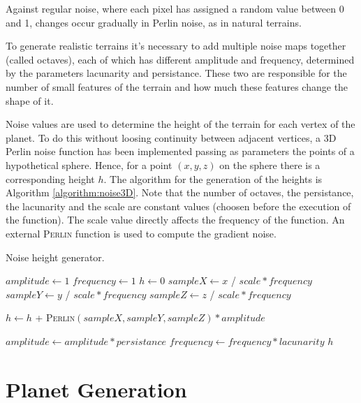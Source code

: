 \documentclass[paper=a4, fontsize=11pt]{scrartcl} %
\numberwithin{equation}{section} %
\numberwithin{figure}{section} %
\numberwithin{table}{section} %
\theoremstyle{definition}
\begin{document}
Against regular noise, where each pixel has assigned a random value between 0
and 1, changes occur gradually in Perlin noise, as in natural terrains.

To generate realistic terrains it's necessary to add multiple noise maps
together (called octaves), each of which has different amplitude and frequency,
determined by the parameters lacunarity and persistance. These two are
responsible for the number of small features of the terrain and how much
these features change the shape of it.

Noise values are used to determine the height of the terrain for each vertex of
the planet. To do this without loosing continuity between adjacent vertices, a 3D
Perlin noise function has been implemented passing as parameters the points of
a hypothetical sphere. Hence, for a point $(x, y, z)$ on the sphere there is a
corresponding height $h$.
The algorithm for the generation of the heights is
Algorithm \ref{algorithm:noise3D}. Note that the number of octaves, the persistance,
the lacunarity and the scale are constant values (choosen before the execution
of the function). The scale value directly affects the frequency of the function.
An external \textsc{Perlin} function is used to compute the gradient noise.

\begin{algorithm}
	\caption{Noise height generator.}
	\label{algorithm:noise3D}
	\begin{algorithmic}[1]
			\State $amplitude \gets 1$
			\State $frequency \gets 1$
			\State $h \gets 0$
				\State $sampleX \gets x$ / $scale * frequency$
				\State $sampleY \gets y$ / $scale * frequency$
				\State $sampleZ \gets z$ / $scale * frequency$
				
				\State $h \gets h$ + \textsc{Perlin}$(sampleX, sampleY, sampleZ) * amplitude$
				
				\State $amplitude \gets amplitude * persistance$
				\State $frequency \gets frequency * lacunarity$
			\EndFor
			\State \Return $h$
		\EndFunction
	\end{algorithmic}
\end{algorithm}


\section{Planet Generation}
\end{document}
